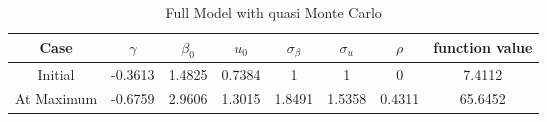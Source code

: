 \documentclass[10pt, letterpaper]{article}
\begin{document}
\begin{table}[h!]
  \begin{center}
    \caption{Full Model with quasi Monte Carlo}  
    \label{tab:start}
    \begin{tabular}{c|cccccc|c} %
      \hline\hline
       Case            &$ \gamma  $&$  \beta_{0} $&$   u_{0}  $&$ \sigma_{\beta} $&$ \sigma_{u}  $&$ \rho $& function value\\
      \hline   
       Initial         & -0.3613  &  1.4825      &  0.7384    &    1            &     1         &    0     &    7.4112    \\ 
       At Maximum      & -0.6759  &  2.9606      &  1.3015    &    1.8491       &  1.5358       &  0.4311  &   65.6452    \\ 
      \hline      \hline
    \end{tabular}
  \end{center}
\end{table} 


\clearpage
\end{document}
